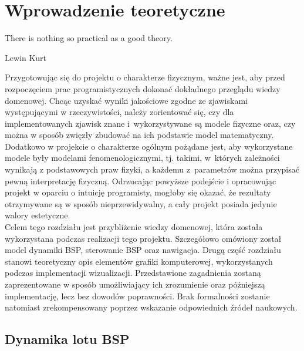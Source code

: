 \chapter{Wprowadzenie teoretyczne} \label{theory}

\epigraph{There is nothing so practical as a good theory.}{Lewin Kurt}

Przygotowując się do projektu o charakterze fizycznym, ważne jest, aby przed rozpoczęciem prac programistycznych dokonać dokładnego przeglądu wiedzy domenowej. Chcąc uzyskać wyniki jakościowe zgodne ze zjawiskami występującymi w rzeczywistości, należy zorientować się, czy dla implementowanych zjawisk znane i~wykorzystywane są modele fizyczne oraz, czy można w sposób zwięzły zbudować na ich podstawie model matematyczny. Dodatkowo w projekcie o charakterze ogólnym pożądane jest, aby wykorzystane modele były modelami fenomenologicznymi, tj. takimi, w~których zależności wynikają z podstawowych praw fizyki, a każdemu z~parametrów można przypisać pewną interpretację fizyczną. Odrzucając powyższe podejście i opracowując projekt w oparciu o intuicję programisty, mogłoby się okazać, że rezultaty otrzymywane są w sposób nieprzewidywalny, a cały projekt posiada jedynie walory estetyczne.\\

Celem tego rozdziału jest przybliżenie wiedzy domenowej, która została wykorzystana podczas realizacji tego projektu. Szczegółowo omówiony został model dynamiki BSP, sterowanie BSP oraz nawigacja. Drugą część rozdziału stanowi teoretyczny opis elementów grafiki komputerowej, wykorzystanych podczas implementacji wizualizacji. Przedstawione zagadnienia zostaną zaprezentowane w sposób umożliwiający ich zrozumienie oraz późniejszą implementację, lecz bez dowodów poprawności. Brak formalności zostanie natomiast zrekompensowany poprzez wskazanie odpowiednich źródeł naukowych.

\section{Dynamika lotu BSP} \label{dynamika_lot}

